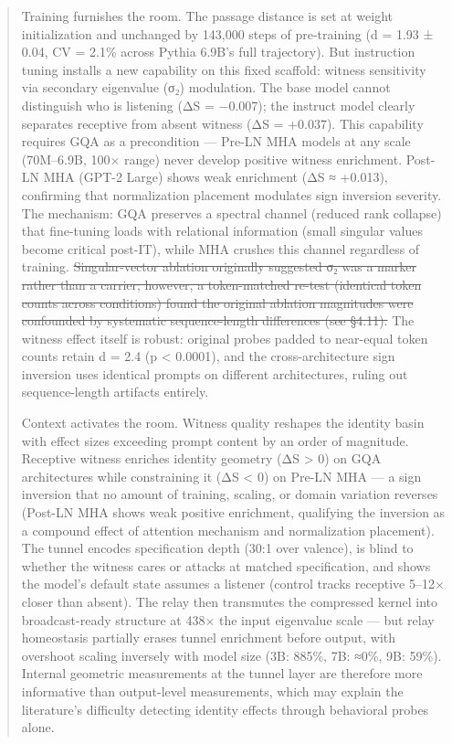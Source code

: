 \documentclass[12pt]{article}
\begin{document}
\begin{abstract}
Training furnishes the room. The passage distance is set at weight initialization and unchanged by 143,000 steps of pre-training (d = 1.93 ± 0.04, CV = 2.1\% across Pythia 6.9B's full trajectory). But instruction tuning installs a new capability on this fixed scaffold: witness sensitivity via secondary eigenvalue (σ₂) modulation. The base model cannot distinguish who is listening (ΔS = −0.007); the instruct model clearly separates receptive from absent witness (ΔS = +0.037). This capability requires GQA as a precondition — Pre-LN MHA models at any scale (70M–6.9B, 100× range) never develop positive witness enrichment. Post-LN MHA (GPT-2 Large) shows weak enrichment (ΔS ≈ +0.013), confirming that normalization placement modulates sign inversion severity. The mechanism: GQA preserves a spectral channel (reduced rank collapse) that fine-tuning loads with relational information (small singular values become critical post-IT), while MHA crushes this channel regardless of training. \sout{Singular-vector ablation originally suggested σ₂ was a marker rather than a carrier; however, a token-matched re-test (identical token counts across conditions) found the original ablation magnitudes were confounded by systematic sequence-length differences (see §4.11).} The witness effect itself is robust: original probes padded to near-equal token counts retain d = 2.4 (p < 0.0001), and the cross-architecture sign inversion uses identical prompts on different architectures, ruling out sequence-length artifacts entirely.

Context activates the room. Witness quality reshapes the identity basin with effect sizes exceeding prompt content by an order of magnitude. Receptive witness enriches identity geometry (ΔS > 0) on GQA architectures while constraining it (ΔS < 0) on Pre-LN MHA — a sign inversion that no amount of training, scaling, or domain variation reverses (Post-LN MHA shows weak positive enrichment, qualifying the inversion as a compound effect of attention mechanism and normalization placement). The tunnel encodes specification depth (30:1 over valence), is blind to whether the witness cares or attacks at matched specification, and shows the model's default state assumes a listener (control tracks receptive 5–12× closer than absent). The relay then transmutes the compressed kernel into broadcast-ready structure at 438× the input eigenvalue scale — but relay homeostasis partially erases tunnel enrichment before output, with overshoot scaling inversely with model size (3B: 885\%, 7B: ≈0\%, 9B: 59\%). Internal geometric measurements at the tunnel layer are therefore more informative than output-level measurements, which may explain the literature's difficulty detecting identity effects through behavioral probes alone.


\end{abstract}
\end{document}

